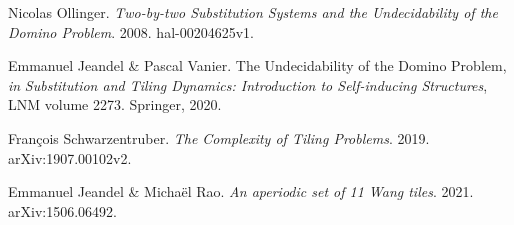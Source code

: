 \documentclass{scrartcl}
\theoremstyle{definition}
\theoremstyle{remark}
\begin{document}
\begin{thebibliography}{9}

   Nicolas Ollinger. \emph{Two-by-two Substitution Systems and the Undecidability of the Domino Problem}. 2008. hal-00204625v1.
  
   Emmanuel Jeandel \& Pascal Vanier. The Undecidability of the Domino Problem, \emph{in} \emph{Substitution and Tiling Dynamics: Introduction to Self-inducing Structures}, LNM volume 2273. Springer, 2020.

   François Schwarzentruber. \emph{The Complexity of Tiling Problems}. 2019. arXiv{\string:}1907.00102v2.

   Emmanuel Jeandel \& Michaël Rao. \emph{An aperiodic set of 11 Wang tiles}. 2021. arXiv{\string:}1506.06492.
\end{thebibliography}
\end{document}
